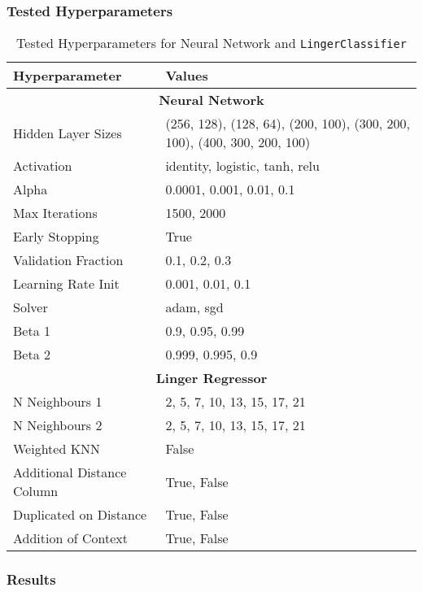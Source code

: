 \documentclass[a4paper, 12pt]{report}
\begin{document}
\subsubsection{Tested Hyperparameters}

\begin{table}[H]
    \centering
    \caption{Tested Hyperparameters for Neural Network and \texttt{LingerClassifier}}
    \label{tab:hyperparameters_raisin}
    \small
    \begin{tabular}{|l|l|}
    \hline
    \textbf{Hyperparameter} & \textbf{Values} \\ \hline
    \multicolumn{2}{|c|}{\textbf{Neural Network}} \\ \hline
    Hidden Layer Sizes & (256, 128), (128, 64), (200, 100), (300, 200, 100), (400, 300, 200, 100) \\ \hline
    Activation & identity, logistic, tanh, relu \\ \hline
    Alpha & 0.0001, 0.001, 0.01, 0.1 \\ \hline
    Max Iterations & 1500, 2000 \\ \hline
    Early Stopping & True \\ \hline
    Validation Fraction & 0.1, 0.2, 0.3 \\ \hline
    Learning Rate Init & 0.001, 0.01, 0.1 \\ \hline
    Solver & adam, sgd \\ \hline
    Beta 1 & 0.9, 0.95, 0.99 \\ \hline
    Beta 2 & 0.999, 0.995, 0.9 \\ \hline
    \multicolumn{2}{|c|}{\textbf{Linger Regressor}} \\ \hline
    N Neighbours 1 & 2, 5, 7, 10, 13, 15, 17, 21 \\ \hline
    N Neighbours 2 & 2, 5, 7, 10, 13, 15, 17, 21 \\ \hline
    Weighted KNN & False \\ \hline
    Additional Distance Column & True, False \\ \hline
    Duplicated on Distance & True, False \\ \hline
    Addition of Context & True, False \\ \hline
    \end{tabular}
\end{table}
\clearpage

\subsubsection{Results}
\end{document}
